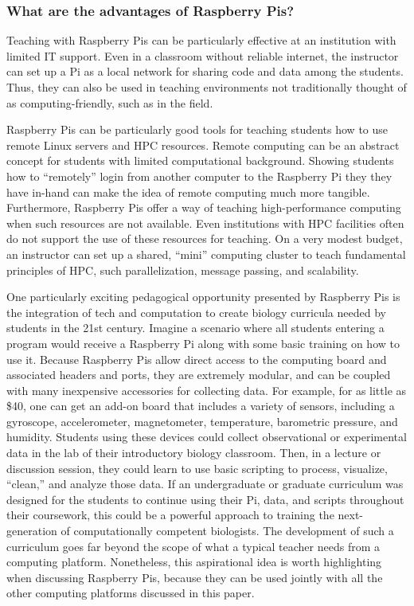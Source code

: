 \subsubsection{What are the advantages of Raspberry Pis?}

Teaching with Raspberry Pis can be particularly effective at an institution
with limited IT support.
Even in a classroom without reliable internet, the instructor can set up a Pi
as a local network for sharing code and data among the students.
Thus, they can also be used in teaching environments not traditionally thought
of as computing-friendly, such as in the field.

Raspberry Pis can be particularly good tools for teaching students how
to use remote Linux servers and HPC resources.
Remote computing can be an abstract concept for students with limited
computational background.
Showing students how to ``remotely'' login from another computer to the
Raspberry Pi they they have in-hand can make the idea of remote computing much
more tangible.
Furthermore, Raspberry Pis offer a way of teaching high-performance
computing when such resources are not available.
Even institutions with HPC facilities often do not support the use of these
resources for teaching.
On a very modest budget, an instructor can set up a shared, ``mini''
computing cluster to teach fundamental principles of HPC, such parallelization,
message passing, and scalability.

One particularly exciting pedagogical opportunity presented by Raspberry Pis is
the integration of tech and computation to create biology curricula needed by
students in the 21st century.
Imagine a scenario where all students entering a program would receive a
Raspberry Pi along with some basic training on how to use it.
Because Raspberry Pis allow direct access to the computing board and
associated headers and ports, they are extremely modular, and can be coupled
with many inexpensive accessories for collecting data.
For example, for as little as \$40, one can get an add-on board that includes
a variety of sensors, including a gyroscope, accelerometer, magnetometer,
temperature, barometric pressure, and humidity.
Students using these devices could collect observational or
experimental data in the lab of their introductory biology classroom.
Then, in a lecture or discussion session, they could learn to use basic
scripting to process, visualize, ``clean,'' and analyze those data.
If an undergraduate or graduate curriculum was designed for the students to
continue using their Pi, data, and scripts throughout their coursework, this
could be a powerful approach to training the next-generation of computationally
competent biologists.
The development of such a curriculum goes far beyond the scope of what a
typical teacher needs from a computing platform.
Nonetheless, this aspirational idea is worth highlighting when discussing
Raspberry Pis, because they can be used jointly with all the other computing platforms
discussed in this paper.


